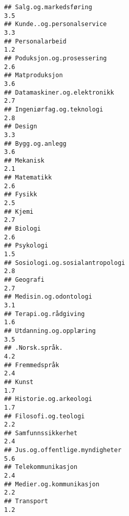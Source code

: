 \documentclass[
]{article}
\begin{document}
\begin{verbatim}
## Salg.og.markedsføring                                                            3.5
## Kunde..og.personalservice                                                        3.3
## Personalarbeid                                                                   1.2
## Poduksjon.og.prosessering                                                        2.6
## Matproduksjon                                                                    3.6
## Datamaskiner.og.elektronikk                                                      2.7
## Ingeniørfag.og.teknologi                                                         2.8
## Design                                                                           3.3
## Bygg.og.anlegg                                                                   3.6
## Mekanisk                                                                         2.1
## Matematikk                                                                       2.6
## Fysikk                                                                           2.5
## Kjemi                                                                            2.7
## Biologi                                                                          2.6
## Psykologi                                                                        1.5
## Sosiologi.og.sosialantropologi                                                   2.8
## Geografi                                                                         2.7
## Medisin.og.odontologi                                                            3.1
## Terapi.og.rådgiving                                                              1.6
## Utdanning.og.opplæring                                                           3.5
## .Norsk.språk.                                                                    4.2
## Fremmedspråk                                                                     2.4
## Kunst                                                                            1.7
## Historie.og.arkeologi                                                            1.7
## Filosofi.og.teologi                                                              2.2
## Samfunnssikkerhet                                                                2.4
## Jus.og.offentlige.myndigheter                                                    5.6
## Telekommunikasjon                                                                2.4
## Medier.og.kommunikasjon                                                          2.2
## Transport                                                                        1.2

\end{verbatim}
\end{document}
